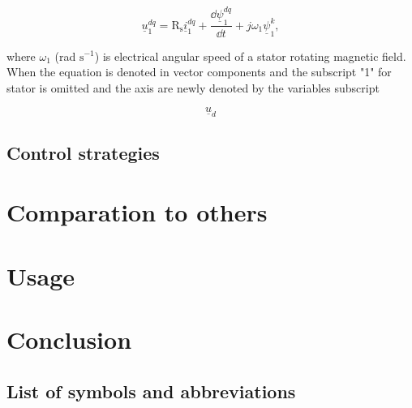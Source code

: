 \documentclass[a4paper, twoside, 11pt]{article}
\newcommand{\fbar}{\FloatBarrier} %
\begin{document}
        \begin{equation}
            \underline{u}^{dq}_1 = \text{R}_\text{s} \underline{i}^{dq}_1 + \frac{\dd \underline{\psi}^{dq}_1 }{\dd t} + j \omega_1 \underline{\psi}^k_1,
        \end{equation}
        
        where $\omega_1$ (rad $\text{s}^{-1}$) is electrical angular speed of a stator rotating magnetic field. When the equation is denoted in vector components and the subscript "1" for stator is omitted and the axis are newly denoted by the variables subscript

        \begin{equation}
            \underline{u}_d
        \end{equation}

    \subsection{Control strategies}

\section{Comparation to others}

\section{Usage}

\newpage
{} 
\section*{Conclusion}

\flushbottom %


\newpage
\setmonofont{Times New Roman}

\printbibliography[title={{References}}]	
\nocite{*}
\setmonofont{CourierPrime-Regular}

\appendix
{}

\begin{appendices}
	\section{List of symbols and abbreviations}

		\printglossary[type=abbreviationslist, style = myStyleAbbreviations]

		\fbar
		\printglossary[type=symbolslist, style =  myStyleSymbols]

	\end{appendices}
\end{document}
